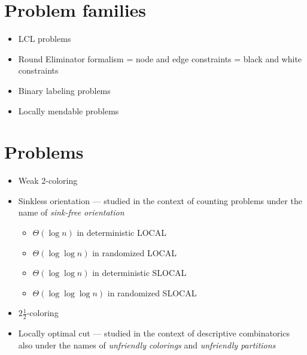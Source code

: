 \documentclass[a4paper,11pt]{article}
\begin{document}
\section{Problem families}
\begin{itemize}
    \item LCL problems \cite{naor-stockmeyer-1995-what-can-be-computed-locally}
    \item Round Eliminator formalism = node and edge constraints = black and white constraints \cite{olivetti-2020-brief-announcement-round-eliminator-a,olivetti-2025-round-eliminator-a-tool-for-automatic}
    \item Binary labeling problems \cite{balliu-brandt-etal-2020-classification-of-distributed}
    \item Locally mendable problems \cite{balliu-hirvonen-etal-2022-local-mending}
\end{itemize}

\section{Problems}
\begin{itemize}
    \item Weak 2-coloring \cite{naor-stockmeyer-1995-what-can-be-computed-locally}
    \item Sinkless orientation \cite{brandt-fischer-etal-2016-a-lower-bound-for-the} --- studied in the context of counting problems under the name of \emph{sink-free orientation} \cite{bubley-dyer-1997-graph-orientations-with-no-sink-and-an}
    \begin{itemize}
        \item $\Theta(\log n)$ in deterministic LOCAL \cite{brandt-fischer-etal-2016-a-lower-bound-for-the,chang-kopelowitz-pettie-2019-an-exponential-separation,ghaffari-su-2017-distributed-degree-splitting-edge}
        \item $\Theta(\log \log n)$ in randomized LOCAL \cite{brandt-fischer-etal-2016-a-lower-bound-for-the,ghaffari-su-2017-distributed-degree-splitting-edge}
        \item $\Theta(\log \log n)$ in deterministic SLOCAL \cite{ghaffari-harris-kuhn-2018-on-derandomizing-local,ghaffari-su-2017-distributed-degree-splitting-edge}
        \item $\Theta(\log \log \log n)$ in randomized SLOCAL \cite{ghaffari-harris-kuhn-2018-on-derandomizing-local,ghaffari-su-2017-distributed-degree-splitting-edge}
    \end{itemize}
    \item $2\frac{1}{2}$-coloring \cite{chang-pettie-2019-a-time-hierarchy-theorem-for-the}
    \item Locally optimal cut \cite{balliu-hirvonen-etal-2019-locality-of-not-so-weak,balliu-boudier-etal-2025-distributed-algorithms-for} --- studied in the context of descriptive combinatorics also under the names of \emph{unfriendly colorings} and \emph{unfriendly partitions} \cite{shelah-milner-2012-graphs-with-no-unfriendly-partitions,conley-2014-measure-theoretic-unfriendly-colorings,conley-marks-unger-2020-measurable-realizations-of,conley-tamuz-2020-unfriendly-colorings-of-graphs-with}
\end{itemize}
\end{document}
